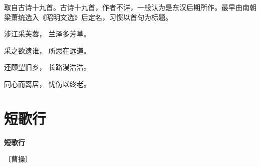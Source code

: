 \documentclass[12pt,UTF-8,openany,fontset=none]{ctexbook}
\begin{document}
    \vspace{12pt}\mbox{}

\begin{large}\xuwen
    取自古诗十九首。古诗十九首，作者不详，一般认为是东汉后期所作。最早由南朝梁萧统选入《昭明文选》后定名，习惯以首句为标题。
\end{large}

    \vspace{12pt}

\begin{center}
    \begin{Large}

        涉江采芙蓉， 兰泽多芳草。

        采之欲遗谁， 所思在远道。

        还顾望旧乡， 长路漫浩浩。

        同心而离居， 忧伤以终老。

    \end{Large}

\end{center}

\vspace{8pt}
\clearpage

\section{短歌行}


\begin{center}
    {\bfseries 短歌行}

    \vspace{18pt}

    \begin{large}\xuwen
        〔曹操〕
    \end{large}

\end{center}

    \vspace{12pt}
\end{document}

